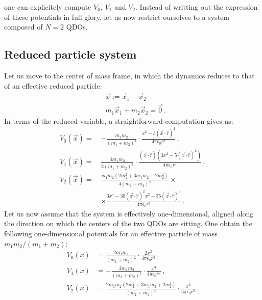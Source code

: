\documentclass[reprint, amsmath, amssymb, aps, prl]{revtex4-2}
\begin{document}
        one can explicitely compute $V_0$, $V_1$ and $V_2$. Instead of writting out the expression of these potentials in full glory, let us now restrict ourselves to a system composed of $N=2$ QDOs.

    \subsection{Reduced particle system}

        Let us move to the center of mass frame, in which the dynamics reduces to that of an effective reduced particle:
        \begin{subequations}
        \begin{align}
            &\vec x:=\vec x_1 - \vec x_2\\
            &m_1\vec x_1 + m_2\vec x_2 = \vec 0\,.
        \end{align}
        \end{subequations}
        In terms of the reduced variable, a straightforward computation gives us:
        \begin{subequations}
        \begin{align}
            V_0(\vec x)=\,&-\frac{m_1m_2}{(m_1+m_2)^2}\cdot\frac{ x^2-3(\vec x\cdot\hat r)^2}{4\pi\epsilon_0r^3}\,,\\
            V_1(\vec x)=\,&\frac{3m_1m_2}{2(m_1+m_2)^2}\cdot\frac{(\vec x\cdot\hat r)\left(3x^2 - 5(\vec x\cdot\hat r)^2\right)}{4\pi\epsilon_0r^4}\,,\\
            V_2(\vec x)=\,&\frac{m_1m_2(2m_1^2+3m_1m_2+2m_2^2)}{4(m_1+m_2)^4}\times\\
            &\times\frac{3x^4 - 30(\vec x\cdot\hat r)^2 x^2+35(\vec x\cdot\hat r)^4}{4\pi\epsilon_0r^5}\nonumber\,.
        \end{align}
        \end{subequations}
        Let us now assume that the system is effectively one-dimensional, aligned along the direction on which the centers of the two QDOs are sitting. One obtain the following one-dimensional potentials for an effective particle of mass $m_1m_2 / (m_1+m_2)$:
        \begin{subequations}
        \begin{align}
            V_0(x)&=\frac{2m_1m_2}{(m_1+m_2)^2}\cdot\frac{2 x^2}{4\pi\epsilon_0r^3}\,,\\
            V_1(x)&=-\frac{3m_1m_2}{(m_1+m_2)^2}\cdot\frac{x^3}{4\pi\epsilon_0r^4}\,,\\
            V_2(x)&=\frac{2m_1m_2(2m_1^2+3m_1m_2+2m_2^2)}{(m_1+m_2)^4}\cdot\frac{x^4}{4\pi\epsilon_0r^5}\,.
        \end{align}
        \end{subequations}
\end{document}
